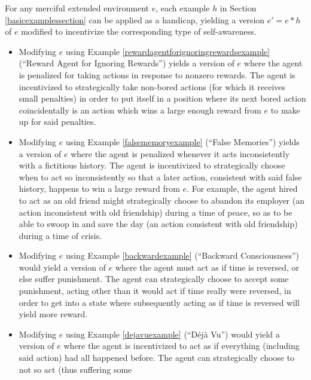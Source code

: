 \documentclass[runningheads]{llncs}
\begin{document}
\begin{example}
    For any merciful extended environment $e$, each example $h$ in
    Section \ref{basicexamplessection} can be applied as a handicap, yielding a
    version $e'=e*h$ of $e$ modified to incentivize the corresponding type of self-awareness.
    \begin{itemize}
        \item
        Modifying $e$ using Example \ref{rewardagentforignoringrewardsexample}
        (``Reward Agent for Ignoring Rewards'')
        yields a version of $e$ where the agent is penalized for taking actions in
        response to nonzero rewards. The agent is incentivized to strategically
        take non-bored actions (for which it receives small penalties) in order to
        put itself in a position where its next bored action coincidentally is an
        action which wins a large enough reward from $e$ to make up for said
        penalties.
        \item
        Modifying $e$ using Example \ref{falsememoryexample}
        (``False Memories'') yields a version of $e$ where the agent is penalized
        whenever it acts inconsistently with a fictitious history. The agent is
        incentivized to strategically choose when to act so inconsistently so that
        a later action, consistent with said false history, happens to win a large
        reward from $e$. For example, the agent hired to act as an old friend
        might strategically choose to abandon its employer (an action inconsistent
        with old friendship) during a time of peace, so as to be able to
        swoop in and save the day (an action consistent with old friendship)
        during a time of crisis.
        \item
        Modifying $e$ using Example \ref{backwardexample}
        (``Backward Consciousness'') would yield a version of $e$
        where the agent must act as if time is reversed, or else suffer punishment.
        The agent can strategically choose to accept some punishment, acting other
        than it would act if time really were reversed, in order to get into a state
        where subsequently acting as if time is reversed will yield more reward.
        \item
        Modifying $e$ using Example \ref{dejavuexample} (``D\'{e}j\`{a} Vu'')
        would yield a version of $e$ where the agent is incentivized
        to act as if
        everything (including said action) had all happened before.
        The agent can strategically choose to not so act (thus suffering some

\end{itemize}
\end{example}
\end{document}
